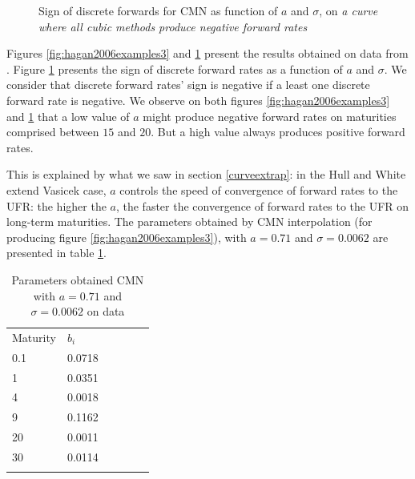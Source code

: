 \begin{figure}[!htb]
\begin{minipage}{0.5\textwidth}
        \caption{Sign of discrete forwards for CMN as function of $a$ and $\sigma$, on \textit{a curve where all cubic methods produce negative forward rates}}
        \label{fig:hagan2006examples4}
    \end{minipage}
  \end{figure}
  
Figures \ref{fig:hagan2006examples3} and \ref{fig:hagan2006examples4} present the results obtained on data from \cite{hagan2006interpolation}. Figure \ref{fig:hagan2006examples4} presents the sign of discrete forward rates as a function of $a$ and $\sigma$. We consider that discrete forward rates' sign is negative if a least one discrete forward rate is negative. We observe on both figures \ref{fig:hagan2006examples3} and \ref{fig:hagan2006examples4} that a low value of $a$ might produce negative forward rates on maturities comprised between $15$ and $20$. But a high value always produces positive forward rates.

\medskip

This is explained by what we saw in section \ref{curveextrap}: in the Hull and White extend Vasicek case, $a$ controls the speed of convergence of forward rates to the UFR: the higher the $a$, the faster the convergence of forward rates to the UFR on long-term maturities. The parameters obtained by CMN interpolation (for producing figure \ref{fig:hagan2006examples3}), with $a = 0.71$ and $\sigma = 0.0062$ are presented in table \ref{tab:hagan2006tables1}.

\begin{table}[!htb]
\begin{center}
\caption{Parameters obtained CMN with $a = 0.71$ and $\sigma = 0.0062$ on \cite{hagan2006interpolation} data}
\label{tab:hagan2006tables1}       %
\begin{tabular}{llllll}
\hline\noalign{\smallskip}
Maturity & $b_i$  \\
\noalign{\smallskip}\hline\noalign{\smallskip}
  0.1 & 0.0718\\
  1 & 0.0351  \\
  4 & 0.0018 \\
  9 & 0.1162  \\
  20 & 0.0011\\
  30 & 0.0114\\
\noalign{\smallskip}\hline
\end{tabular}
\end{center}
\end{table}

